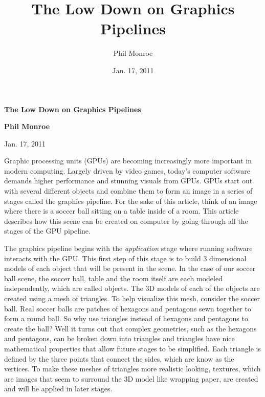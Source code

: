 \documentclass[12pt] {article}
\begin{document}
\title{The Low Down on Graphics Pipelines}
\author{Phil Monroe}
\date{Jan. 17, 2011}

\centerline{
	\Large \bf The Low Down on Graphics Pipelines} %


\centerline{\bf Phil Monroe}

\centerline{Jan. 17, 2011}

\bigskip

Graphic processing units (GPUs) are becoming increasingly more important in modern computing. Largely driven by video games, today's computer software  demands higher performance and stunning visuals from GPUs. GPUs start out with several different objects and combine them to form an image in a series of stages called the graphics pipeline. For the sake of this article, think of an image where there is a soccer ball sitting on a table inside of a room. This article describes how this scene can be created on computer by going through all the stages of the GPU pipeline.

The graphics pipeline begins with the \emph{application} stage where running software interacts with the GPU. This first step of this stage is to build 3 dimensional models of each object that will be present in the scene. In the case of our soccer ball scene, the soccer ball, table and the room itself are each modeled independently, which are called objects. The 3D models of each of the objects are created using a mesh of triangles. To help visualize this mesh, consider the soccer ball. Real soccer balls are patches of hexagons and pentagons sewn together to form a round ball. So why use triangles instead of hexagons and pentagons to create the ball? Well it turns out that complex geometries, such as the hexagons and pentagons, can be broken down into triangles and triangles have nice mathematical properties that allow future stages to be simplified. Each triangle is defined by the three points that connect the sides, which are know as the vertices. To make these meshes of triangles more realistic looking, textures, which are images that seem to surround the 3D model like wrapping paper, are created and will be applied in later stages.
\end{document}
